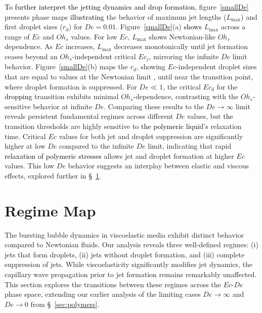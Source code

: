 \documentclass{jfm}
\newcommand{\DL}[1]{{\textcolor{black}{#1}}}
\newcommand{\VS}[1]{{\textcolor{black}{#1}}}
\newcommand{\AO}[1]{{\textcolor{black}{#1}}}
\newcommand{\vsy}[1]{\todo[color=orange, bordercolor=none, textcolor=white]{Vatsal}\textcolor{orange}{#1}}
\newcommand{\oo}{\color{black} \normalfont}
\newcommand{\bb}{\color{black} \normalfont}
\begin{document}
\AO{To further interpret the jetting dynamics and drop formation}, figure~\ref{smallDe} presents phase maps \VS{illustrating} the behavior of maximum jet lengths ($L_{\text{max}}$) and first droplet sizes ($r_d$) for $De = 0.01$. Figure~\ref{smallDe}(a) \DL{shows} $L_{\text{max}}$ across a range of $Ec$ and $Oh_s$ values.
For low $Ec$, $L_{\text{max}}$ shows Newtonian-like $Oh_s$ dependence. As $Ec$ increases, $L_{\text{max}}$ decreases monotonically until jet formation ceases beyond an $Oh_s$-independent critical $Ec_j$, mirroring the infinite $De$ limit behavior.
Figure~\ref{smallDe}(b) maps the $r_d$, showing $Ec$-independent droplet sizes \oo that are equal to values at the Newtonian limit\bb, until near the transition point, where droplet formation is suppressed. For $De \ll 1$, the critical $Ec_d$ for the \VS{dropping} transition exhibits minimal $Oh_s$-dependence, contrasting with the $Oh_s$-sensitive behavior at infinite $De$.
Comparing these results to the $De \to \infty$ limit reveals persistent fundamental regimes across different $De$ values, but \DL{the} transition thresholds are highly sensitive to \DL{the polymeric liquid's} relaxation time. Critical $Ec$ values for both jet and droplet suppression are significantly higher at low $De$ compared to the infinite $De$ limit, indicating that rapid \DL{relaxation of polymeric stresses} allows jet and droplet formation at higher $Ec$ values. This low $De$ behavior suggests an interplay between elastic and viscous effects, explored further in \S~\ref{sec:regimes}.

\section{Regime Map}
\label{sec:regimes}


\oo
The bursting bubble dynamics in viscoelastic media exhibit distinct behavior compared to Newtonian fluids.
Our analysis reveals three well-defined regimes: (i) jets that form droplets, (ii) jets without droplet formation, and (iii) complete suppression of jets. While viscoelasticity significantly modifies jet dynamics, the capillary wave propagation prior to jet formation remains remarkably unaffected.
This section explores the transitions between these regimes across the $Ec$-$De$ phase space, extending our earlier analysis of the limiting cases $De \to \infty$ and $De \to 0$ from \S~\ref{sec:polymers}.
\bb
\end{document}
